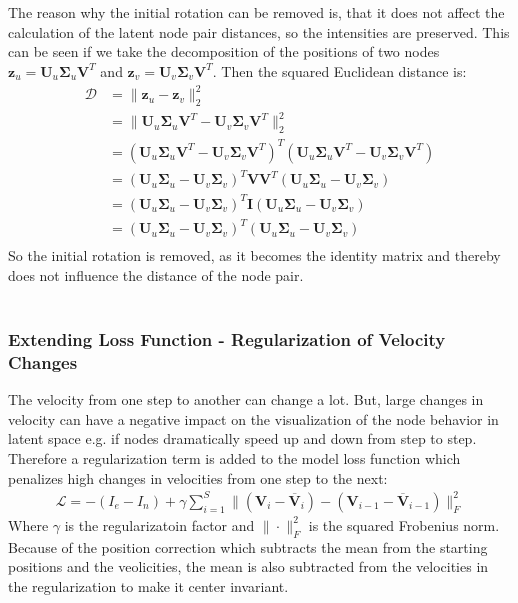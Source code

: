 \\\\
The reason why the initial rotation can be removed is, that it does not affect the calculation of the latent node pair distances, so the intensities are preserved. This can be seen if we take the decomposition of the positions of two nodes $\textbf{z}_u = \textbf{U}_u \boldsymbol{\Sigma}_u \textbf{V}^T$ and $\textbf{z}_v= \textbf{U}_v \boldsymbol{\Sigma}_v \textbf{V}^T$. Then the squared Euclidean distance is:
\begin{align}
      \mathcal{D} &= \rVert \textbf{z}_u - \textbf{z}_v \rVert_2^2 \\
      &= \rVert \textbf{U}_u \boldsymbol{\Sigma}_u \textbf{V}^T - \textbf{U}_v \boldsymbol{\Sigma}_v \textbf{V}^T \rVert_2^2 \\
      &= (\textbf{U}_u \boldsymbol{\Sigma}_u \textbf{V}^T - \textbf{U}_v \boldsymbol{\Sigma}_v \textbf{V}^T)^T (\textbf{U}_u \boldsymbol{\Sigma}_u \textbf{V}^T - \textbf{U}_v \boldsymbol{\Sigma}_v \textbf{V}^T)\\
      &= (\textbf{U}_u \boldsymbol{\Sigma}_u - \textbf{U}_v \boldsymbol{\Sigma}_v)^T\textbf{V} \textbf{V}^T(\textbf{U}_u \boldsymbol{\Sigma}_u - \textbf{U}_v \boldsymbol{\Sigma}_v)\\
      &= (\textbf{U}_u \boldsymbol{\Sigma}_u - \textbf{U}_v \boldsymbol{\Sigma}_v)^T \textbf{I} (\textbf{U}_u \boldsymbol{\Sigma}_u - \textbf{U}_v \boldsymbol{\Sigma}_v)\\
      &= (\textbf{U}_u \boldsymbol{\Sigma}_u - \textbf{U}_v \boldsymbol{\Sigma}_v)^T (\textbf{U}_u \boldsymbol{\Sigma}_u - \textbf{U}_v \boldsymbol{\Sigma}_v)\\
\end{align}
So the initial rotation is removed, as it becomes the identity matrix and thereby does not influence the distance of the node pair.
\clearpage
\\\\
\subsubsection{Extending Loss Function - Regularization of Velocity Changes}
\label{sec:Method:ProposedModel:Regularization}
The velocity from one step to another can change a lot. But, large changes in velocity can have a negative impact on the visualization of the node behavior in latent space e.g. if nodes dramatically speed up and down from step to step.
Therefore a regularization term is added to the model loss function which penalizes high changes in velocities from one step to the next:
\begin{align}
    \mathcal{L} = - (I_e - I_n) + \gamma \sum_{i=1}^{S} \rVert (\textbf{V}_i - \overline{\textbf{V}}_i) - (\textbf{V}_{i-1} - \overline{\textbf{V}}_{i-1}) \rVert_{F}^{2}
    \label{eq:Method:ProposedModel:vec_regularization}
\end{align}
Where $\gamma$ is the regularizatoin factor and $\rVert \cdot \rVert_F^2$ is the squared Frobenius norm. Because of the position correction which subtracts the mean from the starting positions and the veolicities, the mean is also subtracted from the velocities in the regularization to make it center invariant.



